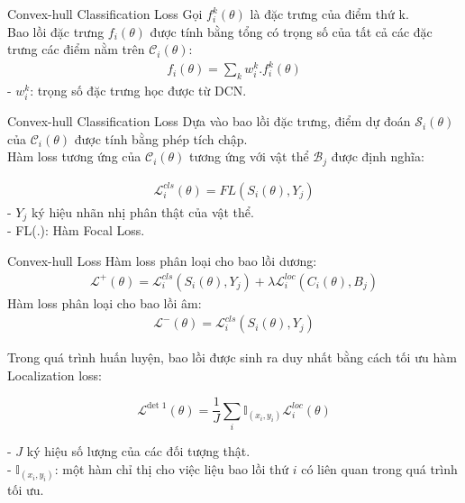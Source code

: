 \documentclass[11pt]{beamer}
\theoremstyle{definition}
\theoremstyle{plain}
\theoremstyle{plain}
\theoremstyle{remark}
\begin{document}
\begin{frame}{Convex-hull Classification Loss}
Gọi $f^k_i{(\theta)}$ là đặc trưng của điểm thứ k.\\
Bao lồi đặc trưng $f_i{(\theta)}$ được tính bằng tổng có trọng số của tất cả các đặc trưng các điểm nằm trên $\mathcal{C}_i{(\theta)}$:
	\begin{align} \label{weight_sumation_of_all_feature_of_point}
		 f_i{(\theta)} = \sum_k w_i^k . f^k_i{(\theta)}
	\end{align}
	- $w_i^k$: trọng số đặc trưng học được từ DCN.
	
\end{frame}
\begin{frame}{Convex-hull Classification Loss}
	Dựa vào bao lồi đặc trưng, điểm dự đoán $\mathcal{S}_i{(\theta)}$ của $\mathcal{C}_i{(\theta)}$ được tính bằng phép tích chập.\\
	Hàm loss tương ứng của $\mathcal{C}_i{(\theta)}$ tương ứng với vật thể $\mathcal{B}_j$ được định nghĩa:
	
	\begin{align} \label{ptdd1}
	\mathcal{L}	_i^{cls} (\theta) =FL(S_i(\theta), Y_j) 
	\end{align}
	- $Y_j$ ký hiệu nhãn nhị phân thật của vật thể.\\
	- FL(.): Hàm Focal Loss.
\end{frame}
\begin{frame}{Convex-hull Loss}
	Hàm loss phân loại cho bao lồi dương:\\
	\begin{align} \label{ptdd2}
		\mathcal{L}^+ (\theta) = 	\mathcal{L}_i^{cls}(S_i(\theta), Y_j) +\lambda 	\mathcal{L}_i^{loc}(C_i(\theta), B_j)
	\end{align}
	Hàm loss phân loại cho bao lồi âm:\\
	\begin{align} \label{ptdd3}
		\mathcal{L}^- (\theta) = \mathcal{L}_i^{cls}(S_i(\theta), Y_j) 
	\end{align}
	
	\end{frame}
\begin{frame}
	Trong quá trình huấn luyện, bao lồi được sinh ra duy nhất bằng cách tối ưu hàm Localization loss:

	\begin{equation}
		\mathcal{L}^{\text {det } 1}(\theta)=\frac{1}{J} \sum_i \mathbb{I}_{\left(x_i, y_i\right)} \mathcal{L}_i^{l o c}(\theta)
	\end{equation}

	- $J$ ký hiệu số lượng của các đối tượng thật. \\
	-  $\mathbb{I}_{\left(x_i, y_i\right)}$: một hàm chỉ thị cho việc liệu bao lồi thứ $i$ có liên quan trong quá trình tối ưu.
\end{frame}
\end{document}
